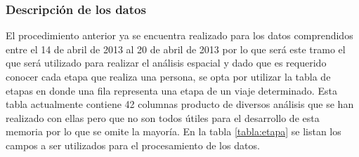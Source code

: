 \documentclass[12pt]{article}
\begin{document}

\subsubsection{Descripción de los datos}

El procedimiento anterior ya se encuentra realizado para los datos comprendidos entre el 14 de abril de 2013 al 20 de abril de 2013 por lo que será este tramo el que será utilizado para realizar el análisis espacial y dado que es requerido conocer cada etapa que realiza una persona, se opta por utilizar la tabla de etapas en donde una fila representa una etapa de un viaje determinado. Esta tabla actualmente contiene 42 columnas producto de diversos análisis que se han realizado con ellas pero que no son todos útiles para el desarrollo de esta memoria por lo que se omite la mayoría. En la tabla \ref{tabla:etapa} se listan los campos a ser utilizados para el procesamiento de los datos.
\end{document}
